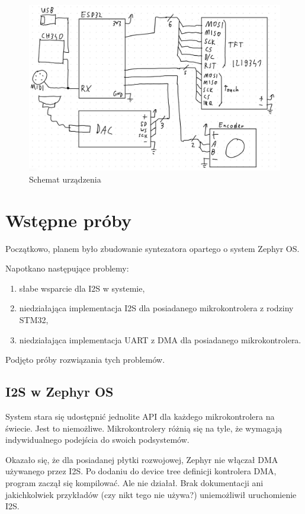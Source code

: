 \documentclass[12pt,a4paper,openright,dvipsnames]{mwart}
\begin{document}
\begin{figure}[h]
    \centering
    \includegraphics[width=\textwidth]{schem}
    \caption{Schemat urządzenia}
\end{figure}


\section{Wstępne próby}

Początkowo, planem było zbudowanie syntezatora
opartego o system Zephyr OS.

Napotkano następujące problemy:
\begin{enumerate}
    \item słabe wsparcie dla I2S w systemie,
    \item niedziałająca implementacja I2S dla posiadanego mikrokontrolera z rodziny STM32,
    \item niedziałająca implementacja UART z DMA dla posiadanego mikrokontrolera.
\end{enumerate}

Podjęto próby rozwiązania tych problemów.

\subsection{I2S w Zephyr OS}

System stara się udostępnić jednolite API dla każdego mikrokontrolera
na świecie. Jest to niemożliwe. Mikrokontrolery różnią się na tyle,
że wymagają indywidualnego podejścia do swoich podsystemów.

Okazało się, że dla posiadanej płytki rozwojowej, Zephyr
nie włączał DMA używanego przez I2S. Po dodaniu
do device tree definicji kontrolera DMA, program zaczął się
kompilować. Ale nie działał. Brak dokumentacji ani
jakichkolwiek przykładów (czy nikt tego nie używa?)
uniemożliwił uruchomienie I2S.
\end{document}
